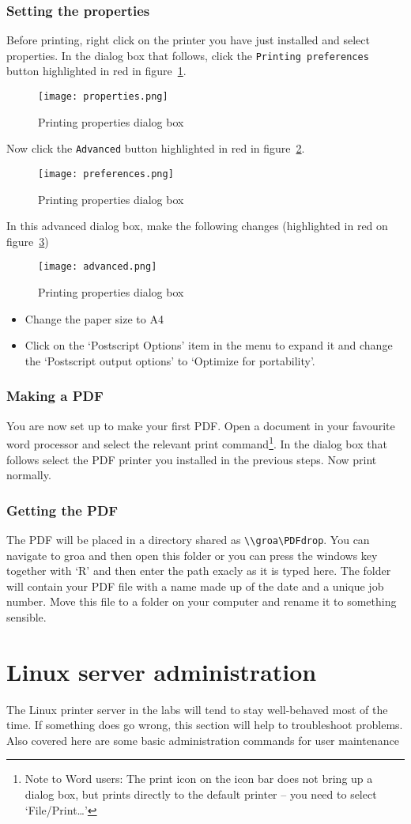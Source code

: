 \subsubsection{Setting the properties}
Before printing, right click on the printer you have just installed and select properties.  In the dialog box that follows, click the \verb|Printing preferences| button highlighted in red in figure~\ref{fig:properties}.  
\begin{figure}
	\centering
	\texttt{[image: properties.png]}
	\caption{Printing properties dialog box}
	\label{fig:properties}
\end{figure}
Now click the \verb|Advanced| button highlighted in red in figure~\ref{fig:preferences}.  
\begin{figure}
	\centering
	\texttt{[image: preferences.png]}
	\caption{Printing properties dialog box}
	\label{fig:preferences}
\end{figure}
In this advanced dialog box, make the following changes (highlighted in red on figure~\ref{fig:advanced})
\begin{figure}
	\centering
	\texttt{[image: advanced.png]}
	\caption{Printing properties dialog box}
	\label{fig:advanced}
\end{figure}
\begin{itemize}
	\item Change the paper size to A4
	\item Click on the `Postscript Options' item in the menu to expand it and change the `Postscript output options' to `Optimize for portability'.
\end{itemize}

\subsubsection{Making a PDF}
You are now set up to make your first PDF.  Open a document in your favourite word processor and select the relevant print command\footnote{Note to Word users:  The print icon on the icon bar does not bring up a dialog box, but prints directly to the default printer -- you need to select `File/Print\dots'}.  In the dialog box that follows select the PDF printer you installed in the previous steps.  Now print normally.

\subsubsection{Getting the PDF}
The PDF will be placed in a directory shared as \verb|\\groa\PDFdrop|.  You can navigate to groa and then open this folder or you can press the windows key together with `R' and then enter the path exacly as it is typed here.  The folder will contain your PDF file with a name made up of the date and a unique job number.  Move this file to a folder on your computer and rename it to something sensible.

\section{Linux server administration}
The Linux printer server in the labs will tend to stay well-behaved most of the time.  If something does go wrong, this section will help to troubleshoot problems.  Also covered here are some basic administration commands for user maintenance
